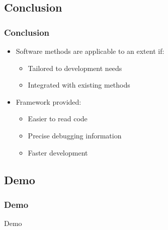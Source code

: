 \documentclass[british,10pt]{beamer}
\begin{document}
\subsection{Conclusion}

\begin{frame}\frametitle{Conclusion}
\begin{itemize}
\item Software methods are applicable to an extent if:
\begin{itemize}
\item Tailored to development needs
\item Integrated with existing methods
\end{itemize}
\item Framework provided:
\begin{itemize}
\item Easier to read code
\item Precise debugging information
\item Faster development
\end{itemize}
\end{itemize}
\end{frame}

\subsection{Demo}

\begin{frame}\frametitle{Demo}
\centering
\Huge Demo
\end{frame}
\end{document}
